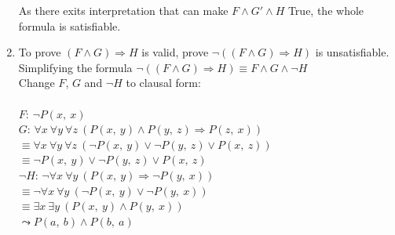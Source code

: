 \documentclass{article}
\begin{document}
\begin{enumerate}
\begin{itemize}
    \end{itemize}
    As there exits interpretation that can make $F \wedge G' \wedge H$ True, the whole formula is satisfiable.
    \item
    To prove $(F \wedge G) \Rightarrow H$ is valid, prove $\neg ((F \wedge G) \Rightarrow H)$ is unsatisfiable.\\
    Simplifying the formula $\neg ((F \wedge G) \Rightarrow H) \equiv F \wedge G \wedge \neg H$\\
    Change $F$, $G$ and $\neg H$ to clausal form:\\
    \hspace{1pt}\\
    \vspace{2pt}$F$: $\neg P(x,\ x)$\\
    $G$: $\forall x\ \forall y\ \forall z\ (P(x,\ y) \wedge P(y,\ z) \Rightarrow P(z,\ x))$\\
    \hspace*{4.5pt}$\equiv \forall x\ \forall y\ \forall z\ (\neg P(x,\ y) \vee \neg P(y,\ z) \vee P(x,\ z))$\\
    \vspace{2pt}\hspace*{4.5pt}$\equiv \neg P(x,\ y) \vee \neg P(y,\ z) \vee P(x,\ z)$\\
    $\neg H$: $\neg \forall x\ \forall y\ (P(x,\ y) \Rightarrow \neg P(y,\ x))$\\
    \hspace*{12.5pt}$\equiv\neg \forall x\ \forall y\ (\neg P(x,\ y) \vee \neg P(y,\ x))$\\
    \hspace*{12.5pt}$\equiv \exists x\ \exists y\ (P(x,\ y) \wedge P(y,\ x))$\\
    \vspace{10pt}\hspace*{12.5pt}$\leadsto P(a,\ b) \wedge P(b,\ a)$\\

\end{enumerate}
\end{document}

